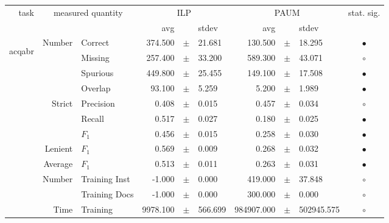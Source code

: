 \begin{longtable}{|r|r|l||rcl|rcl|c|}
\hline
\multirow{2}{*}{task} & \multicolumn{2}{|c||}{\multirow{2}{*}{measured quantity}} & \multicolumn{3}{|c|}{ILP} & \multicolumn{3}{|c|}{PAUM} & \multirow{2}{*}{ stat. sig.}\\
\cline{4-9}
  & \multicolumn{2}{|c||}{} &  avg  &    &  stdev  &  avg  &    &  stdev  & \\
\hline
\endhead
\hline
\hline
\multirow{11}{*}{\begin{sideways}acqabr\end{sideways} }
& \multirow{4}{*}{    Number} &         Correct &     374.500 &  $\pm$  &      21.681 &     130.500 &  $\pm$  &      18.295 & $\bullet$ \\
&                             &         Missing &     257.400 &  $\pm$  &      33.200 &     589.300 &  $\pm$  &      43.071 & $\circ$ \\
&                             &        Spurious &     449.800 &  $\pm$  &      25.455 &     149.100 &  $\pm$  &      17.508 & $\bullet$ \\
&                             &         Overlap &      93.100 &  $\pm$  &       5.259 &       5.200 &  $\pm$  &       1.989 & $\bullet$ \\
& \multirow{3}{*}{    Strict} &       Precision &       0.408 &  $\pm$  &       0.015 &       0.457 &  $\pm$  &       0.034 & $\circ$ \\
&                             &          Recall &       0.517 &  $\pm$  &       0.027 &       0.180 &  $\pm$  &       0.025 & $\bullet$ \\
&                             &           $F_1$ &       0.456 &  $\pm$  &       0.015 &       0.258 &  $\pm$  &       0.030 & $\bullet$ \\
&                     Lenient &           $F_1$ &       0.569 &  $\pm$  &       0.009 &       0.268 &  $\pm$  &       0.032 & $\bullet$ \\
&                     Average &           $F_1$ &       0.513 &  $\pm$  &       0.011 &       0.263 &  $\pm$  &       0.031 & $\bullet$ \\
& \multirow{2}{*}{    Number} &   Training Inst &      -1.000 &  $\pm$  &       0.000 &     419.000 &  $\pm$  &      37.848 & $\circ$ \\
&                             &   Training Docs &      -1.000 &  $\pm$  &       0.000 &     300.000 &  $\pm$  &       0.000 & $\circ$ \\
& \multirow{2}{*}{      Time} &        Training &    9978.100 &  $\pm$  &     566.699 &  984907.000 &  $\pm$  &  502945.575 & $\circ$ \\

\end{longtable}
